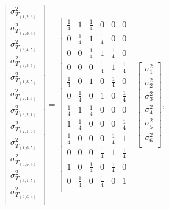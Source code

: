 \[\left[\begin{array}{c}
    \sigma_{T_{(1,2,3)}}^2 \\
    \sigma_{T_{(2,3,4)}}^2 \\
    \sigma_{T_{(3,4,5)}}^2 \\
    \sigma_{T_{(4,5,6)}}^2 \\
    \sigma_{T_{(1,3,5)}}^2 \\
    \sigma_{T_{(2,4,6)}}^2 \\

    \sigma_{T_{(3,2,1)}}^2 \\
    \sigma_{T_{(2,1,6)}}^2 \\
    \sigma_{T_{(1,6,5)}}^2 \\
    \sigma_{T_{(6,5,4)}}^2 \\
    \sigma_{T_{(3,1,5)}}^2 \\
    \sigma_{T_{(2,6,4)}}^2 \\
  \end{array}
  \right]
= \left[ \begin{array}{cccccc}
    \frac{1}{4} & 1 & \frac{1}{4} & 0 & 0 & 0 \\
    0 & \frac{1}{4} & 1 & \frac{1}{4} & 0 & 0 \\
    0 & 0 & \frac{1}{4} & 1 & \frac{1}{4} & 0 \\
    0 & 0 & 0 & \frac{1}{4} & 1 & \frac{1}{4} \\
    \frac{1}{4} & 0 & 1 & 0 & \frac{1}{4} & 0 \\
    0 & \frac{1}{4} & 0 & 1 & 0 & \frac{1}{4}\\

    \frac{1}{4} & 1 & \frac{1}{4} & 0 & 0 & 0 \\
    1 & \frac{1}{4} & 0 & 0 & 0 & \frac{1}{4} \\
    \frac{1}{4} & 0 & 0 & 0 & \frac{1}{4} & 1 \\
    0 & 0 & 0 & \frac{1}{4} & 1 & \frac{1}{4} \\
    1 & 0 & \frac{1}{4} & 0 & \frac{1}{4} & 0 \\
    0 & \frac{1}{4} & 0 & \frac{1}{4} & 0 & 1 \\
  \end{array}
  \right]
\left[
  \begin{array}{c}
    \sigma_1^2 \\
    \sigma_2^2 \\
    \sigma_3^2 \\
    \sigma_4^2 \\
    \sigma_5^2 \\
    \sigma_6^2 \\
  \end{array}
  \right],\]

